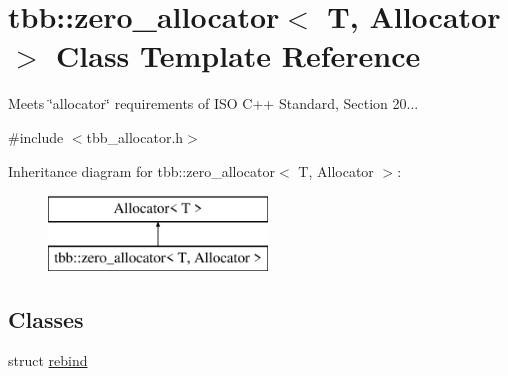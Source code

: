 \hypertarget{classtbb_1_1zero__allocator}{}\section{tbb\+:\+:zero\+\_\+allocator$<$ T, Allocator $>$ Class Template Reference}
\label{classtbb_1_1zero__allocator}


Meets \char`\"{}allocator\char`\"{} requirements of I\+S\+O C++ Standard, Section 20...  




{\ttfamily \#include $<$tbb\+\_\+allocator.\+h$>$}

Inheritance diagram for tbb\+:\+:zero\+\_\+allocator$<$ T, Allocator $>$\+:\begin{figure}[H]
\begin{center}
\leavevmode
\includegraphics[height=2.000000cm]{classtbb_1_1zero__allocator}
\end{center}
\end{figure}
\subsection*{Classes}
\begin{DoxyCompactItemize}
\item 
struct \hyperlink{structtbb_1_1zero__allocator_1_1rebind}{rebind}
\end{DoxyCompactItemize}
